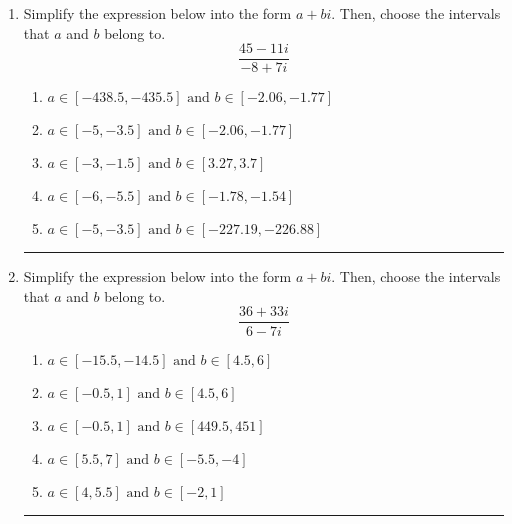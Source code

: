 \documentclass[14pt]{extbook}
\newcommand{\litem}[1]{\item#1\hspace*{-1cm}\rule{\textwidth}{0.4pt}}
\begin{document}
\begin{enumerate}
{\begin{enumerate}[label=\Alph*.]
\end{enumerate} }
\litem{
Simplify the expression below into the form $a+bi$. Then, choose the intervals that $a$ and $b$ belong to.\[ \frac{45 - 11 i}{-8 + 7 i} \]\begin{enumerate}[label=\Alph*.]
\item \( a \in [-438.5, -435.5] \text{ and } b \in [-2.06, -1.77] \)
\item \( a \in [-5, -3.5] \text{ and } b \in [-2.06, -1.77] \)
\item \( a \in [-3, -1.5] \text{ and } b \in [3.27, 3.7] \)
\item \( a \in [-6, -5.5] \text{ and } b \in [-1.78, -1.54] \)
\item \( a \in [-5, -3.5] \text{ and } b \in [-227.19, -226.88] \)

\end{enumerate} }
\litem{
Simplify the expression below into the form $a+bi$. Then, choose the intervals that $a$ and $b$ belong to.\[ \frac{36 + 33 i}{6 - 7 i} \]\begin{enumerate}[label=\Alph*.]
\item \( a \in [-15.5, -14.5] \text{ and } b \in [4.5, 6] \)
\item \( a \in [-0.5, 1] \text{ and } b \in [4.5, 6] \)
\item \( a \in [-0.5, 1] \text{ and } b \in [449.5, 451] \)
\item \( a \in [5.5, 7] \text{ and } b \in [-5.5, -4] \)
\item \( a \in [4, 5.5] \text{ and } b \in [-2, 1] \)

\end{enumerate} }
\end{enumerate}
\end{document}

